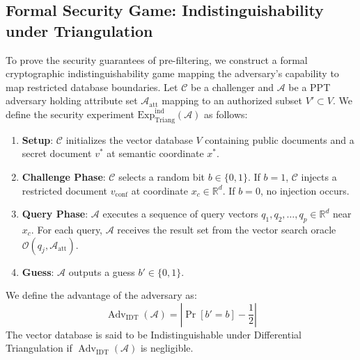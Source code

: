 \documentclass[sigconf]{acmart}
\begin{document}
\subsection{Formal Security Game: Indistinguishability under Triangulation}
To prove the security guarantees of pre-filtering, we construct a formal cryptographic indistinguishability game mapping the adversary's capability to map restricted database boundaries. Let $\mathcal{C}$ be a challenger and $\mathcal{A}$ be a PPT adversary holding attribute set $\mathcal{A}_{\text{att}}$ mapping to an authorized subset $V' \subset V$. We define the security experiment $\text{Exp}_{\text{Triang}}^{\text{ind}}(\mathcal{A})$ as follows:
\begin{enumerate}
    \item \textbf{Setup}: $\mathcal{C}$ initializes the vector database $V$ containing public documents and a secret document $v^*$ at semantic coordinate $x^*$.
    \item \textbf{Challenge Phase}: $\mathcal{C}$ selects a random bit $b \in \{0, 1\}$. If $b=1$, $\mathcal{C}$ injects a restricted document $v_{\text{conf}}$ at coordinate $x_c \in \mathbb{R}^d$. If $b=0$, no injection occurs.
    \item \textbf{Query Phase}: $\mathcal{A}$ executes a sequence of query vectors $q_1, q_2, \dots, q_p \in \mathbb{R}^d$ near $x_c$. For each query, $\mathcal{A}$ receives the result set from the vector search oracle $\mathcal{O}(q_j, \mathcal{A}_{\text{att}})$.
    \item \textbf{Guess}: $\mathcal{A}$ outputs a guess $b' \in \{0, 1\}$.
\end{enumerate}

We define the advantage of the adversary as:
\begin{equation}
    \operatorname{Adv}_{\text{IDT}}(\mathcal{A}) = \left| \Pr[b' = b] - \frac{1}{2} \right|
\end{equation}
The vector database is said to be Indistinguishable under Differential Triangulation if $\operatorname{Adv}_{\text{IDT}}(\mathcal{A})$ is negligible.
\end{document}
